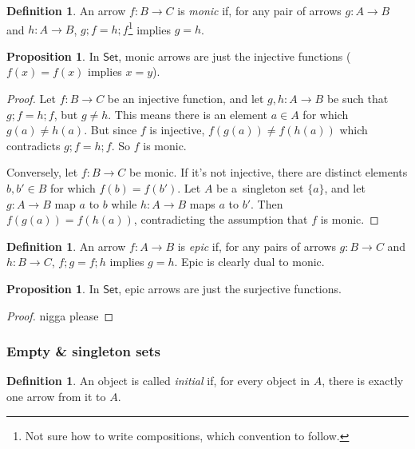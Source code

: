 \documentclass{amsart}
\theoremstyle{definition}
\newtheorem{definition}[thm]{Definition}
\newtheorem{proposition}[thm]{Proposition}
\newcommand{\cat}[1]{\mathsf{#1}} %
\renewcommand{\emph}{\textit} %
\begin{document}
\begin{definition}
An arrow $f: B \to C$ is \emph{monic} if, for any pair of arrows $g: A\to B$ and $h: A\to B$, $g;\! f = h;\! f$\footnote{Not sure how to write compositions, which convention to follow. } implies $g=h$.
\end{definition}

\begin{proposition}
In $\cat{Set}$, monic arrows are just the injective functions ($f(x) = f(x)$ implies $x=y$). 
\end{proposition}

\begin{proof}
  Let $f: B\to C$ be an injective function, and let $g,h: A\to B$ be such that $g;\! f = h;\! f$, but $g\neq h$. This means there is an element $a\in A$ for which $g(a) \neq h(a)$. But since $f$ is injective, $f(g(a))\neq f(h(a))$ which contradicts $g;\! f = h;\! f$. So $f$ is monic.

  Conversely, let $f: B \to C$ be monic. If it's not injective, there are distinct elements $b, b' \in B$ for which $f(b) = f(b')$. Let $A$ be a~singleton set $\{a\}$, and let $g: A\to B$ map $a$ to $b$ while $h: A\to B$ maps $a$ to $b'$. Then $f(g(a)) = f(h(a))$, contradicting the assumption that $f$ is monic. 
\end{proof}

\begin{definition}
An arrow $f: A\to B$ is \emph{epic} if, for any pairs of arrows $g: B\to C$ and $h: B\to C$, $f;\! g = f;\! h$ implies $g=h$. Epic is clearly dual to monic. 
\end{definition}

\begin{proposition}
In $\cat{Set}$, epic arrows are just the surjective functions. 
\end{proposition}

\begin{proof}
  nigga please
\end{proof}

\subsubsection{Empty \& singleton sets}

\begin{definition}
An object is called \emph{initial} if, for every object in $A$, there is exactly one arrow from it to $A$. 
\end{definition}
\end{document}
